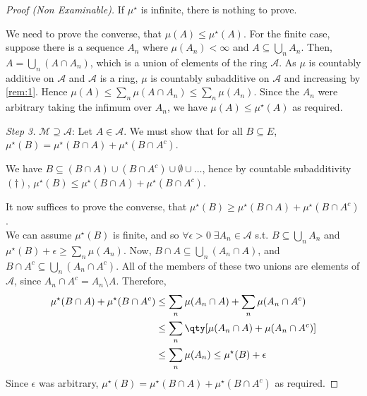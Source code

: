 \begin{proof}[Proof (Non Examinable)]
	If $\mu^\star$ is infinite, there is nothing to prove.

	We need to prove the converse, that $\mu(A) \leq \mu^\star(A)$.
	For the finite case, suppose there is a sequence $A_n$ where $\mu(A_n) < \infty$ and $A \subseteq \bigcup_n A_n$.
	Then, $A = \bigcup_n (A \cap A_n)$, which is a union of elements of the ring $\mathcal A$.
	As $\mu$ is countably additive on $\mathcal{A}$ and $\mathcal{A}$ is a ring, $\mu$ is countably subadditive on $\mathcal{A}$ and increasing by \cref{rem:1}.
	Hence $\mu(A) \leq \sum_n \mu(A \cap A_n) \leq \sum_n \mu(A_n)$.
	Since the $A_n$ were arbitrary taking the infimum over $A_n$, we have $\mu(A) \leq \mu^\star(A)$ as required.

	\emph{Step 3.} $\mathcal M \supseteq \mathcal A$:
	Let $A \in \mathcal A$.
	We must show that for all $B \subseteq E$, $\mu^\star(B) = \mu^\star(B \cap A) + \mu^\star(B \cap A^c)$.

	We have $B \subseteq (B \cap A) \cup (B \cap A^c) \cup \emptyset \cup \dots$, hence by countable subadditivity $(\dagger)$, $\mu^\star(B) \leq \mu^\star(B \cap A) + \mu^\star(B \cap A^c)$.

	It now suffices to prove the converse, that $\mu^\star(B) \geq \mu^\star(B \cap A) + \mu^\star(B \cap A^c)$. \\
	We can assume $\mu^\star(B)$ is finite, and so $\forall \epsilon > 0 \; \exists A_n \in \mathcal A$ s.t. $B \subseteq \bigcup_n A_n$ and $\mu^\star(B) + \epsilon \geq \sum_n \mu(A_n)$.
	Now, $B \cap A \subseteq \bigcup_n (A_n \cap A)$, and $B \cap A^c \subseteq \bigcup_n (A_n \cap A^c)$.
	All of the members of these two unions are elements of $\mathcal A$, since $A_n \cap A^c = A_n \setminus A$.
	Therefore,
	\begin{align*}
		\mu^\star(B \cap A) + \mu^\star(B \cap A^c) &\leq \sum_n \mu(A_n \cap A) + \sum_n \mu(A_n \cap A^c) \\
		&\leq \sum_n \qty[ \mu(A_n \cap A) + \mu(A_n \cap A^c) ] \\
		&\leq \sum_n \mu(A_n) \leq \mu^\star(B) + \epsilon
	\end{align*}
	Since $\epsilon$ was arbitrary, $\mu^\star(B) = \mu^\star(B \cap A) + \mu^\star(B \cap A^c)$ as required.


\end{proof}
